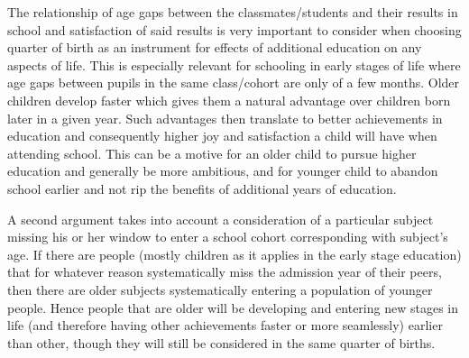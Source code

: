 \documentclass{article}
\begin{document}
The relationship of age gaps between the classmates/students and their results in school and satisfaction of said results is very important to consider when choosing quarter of birth as an instrument for effects of additional education on any aspects of life. This is especially relevant for schooling in early stages of life where age gaps between pupils in the same class/cohort are only of a few months. Older children develop faster which gives them a natural advantage over children born later in a given year. Such advantages then translate to better achievements in education and consequently higher joy and satisfaction a child will have when attending school. This can be a motive for an older child to pursue higher education and generally be more ambitious, and for younger child to abandon school earlier and not rip the benefits of additional years of education.

A second argument takes into account a consideration of a particular subject missing his or her window to enter a school cohort corresponding with subject's age. If there are people (mostly children as it applies in the early stage education) that for whatever reason systematically miss the admission year of their peers, then there are older subjects systematically entering a population of younger people. Hence people that are older will be developing and entering new stages in life (and therefore having other achievements faster or more seamlessly) earlier than other, though they will still be considered in the same quarter of births.

\newpage

\appendix
\end{document}
